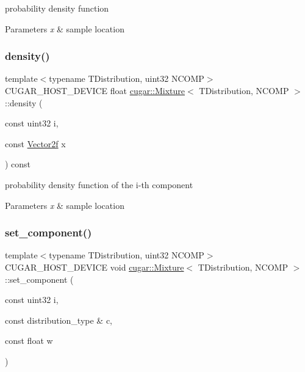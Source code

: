 probability density function


\begin{DoxyParams}{Parameters}
{\em x} & sample location \\
\hline
\end{DoxyParams}
\mbox{\label{structcugar_1_1_mixture_a1f5002f32c4f8af39983d3b805721007}} 
\subsubsection{\texorpdfstring{density()}{density()}\hspace{0.1cm}{\footnotesize\ttfamily [2/2]}}
{\footnotesize\ttfamily template$<$typename T\+Distribution, uint32 N\+C\+O\+MP$>$ \\
C\+U\+G\+A\+R\+\_\+\+H\+O\+S\+T\+\_\+\+D\+E\+V\+I\+CE float \hyperlink{structcugar_1_1_mixture}{cugar\+::\+Mixture}$<$ T\+Distribution, N\+C\+O\+MP $>$\+::density (\begin{DoxyParamCaption}\item[{const uint32}]{i,  }\item[{const \hyperlink{structcugar_1_1_vector}{Vector2f}}]{x }\end{DoxyParamCaption}) const\hspace{0.3cm}{\ttfamily [inline]}}

probability density function of the i-\/th component


\begin{DoxyParams}{Parameters}
{\em x} & sample location \\
\hline
\end{DoxyParams}
\mbox{\label{structcugar_1_1_mixture_a0f98ea273f18224f1a7376b0967a8104}} 
\subsubsection{\texorpdfstring{set\+\_\+component()}{set\_component()}\hspace{0.1cm}{\footnotesize\ttfamily [1/2]}}
{\footnotesize\ttfamily template$<$typename T\+Distribution, uint32 N\+C\+O\+MP$>$ \\
C\+U\+G\+A\+R\+\_\+\+H\+O\+S\+T\+\_\+\+D\+E\+V\+I\+CE void \hyperlink{structcugar_1_1_mixture}{cugar\+::\+Mixture}$<$ T\+Distribution, N\+C\+O\+MP $>$\+::set\+\_\+component (\begin{DoxyParamCaption}\item[{const uint32}]{i,  }\item[{const distribution\+\_\+type \&}]{c,  }\item[{const float}]{w }\end{DoxyParamCaption})\hspace{0.3cm}{\ttfamily [inline]}}

